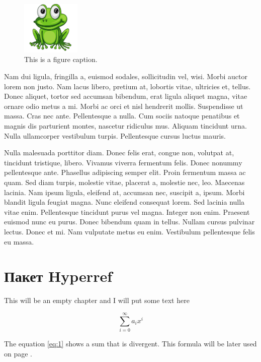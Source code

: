 \documentclass{article}
\begin{document}
\begin{figure}
\centering
\includegraphics[width=0.25\textwidth]{images/frog.jpg}
\caption{\label{fig:frog2}This is a figure caption.}
\end{figure}

Nam dui ligula, fringilla a, euismod sodales, sollicitudin vel, wisi. Morbi auctor lorem non justo. Nam lacus libero, pretium at, lobortis vitae, ultricies et, tellus. Donec aliquet, tortor sed accumsan bibendum, erat ligula aliquet magna, vitae ornare odio metus a mi. Morbi ac orci et nisl hendrerit mollis. Suspendisse ut massa. Cras nec ante. Pellentesque a nulla. Cum sociis natoque penatibus et magnis dis parturient montes, nascetur ridiculus mus. Aliquam tincidunt urna. Nulla ullamcorper vestibulum turpis. Pellentesque cursus luctus mauris.

Nulla malesuada porttitor diam. Donec felis erat, congue non, volutpat at, tincidunt tristique, libero. Vivamus viverra fermentum felis. Donec nonummy pellentesque ante. Phasellus adipiscing semper elit. Proin fermentum massa ac quam. Sed diam turpis, molestie vitae, placerat a, molestie nec, leo. 
Maecenas lacinia. Nam ipsum ligula, eleifend at, accumsan nec, suscipit a, ipsum. Morbi blandit ligula feugiat magna. Nunc eleifend consequat lorem. Sed lacinia nulla vitae enim. Pellentesque tincidunt purus vel magna. Integer non enim. Praesent euismod nunc eu purus. Donec bibendum quam in tellus. Nullam cursus pulvinar lectus. Donec et mi. Nam vulputate metus eu enim. Vestibulum 
pellentesque felis eu massa.
\clearpage


\section{Пакет Hyperref}

This will be an empty chapter and I will put some text here

\begin{equation}
\label{eq:1}
\sum_{i=0}^{\infty} a_i x^i
\end{equation}

The equation \ref{eq:1} shows a sum that is divergent. This formula will be later used on page \pageref{second}.
\end{document}
